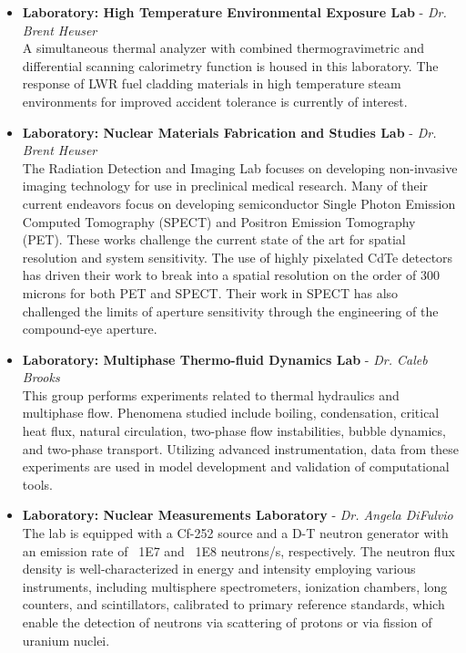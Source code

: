 \begin{itemize}
  \item \textbf{Laboratory: High Temperature Environmental Exposure Lab} - \textit{Dr. Brent Heuser}\\
  A simultaneous thermal analyzer with combined thermogravimetric and differential scanning calorimetry function is housed in this laboratory. The response of LWR fuel cladding materials in high temperature steam environments for improved accident tolerance is currently of interest.

  \item \textbf{Laboratory: Nuclear Materials Fabrication and Studies Lab} - \textit{Dr. Brent Heuser}\\
  The Radiation Detection and Imaging Lab focuses on developing non-invasive imaging technology for use in preclinical medical research. Many of their current endeavors focus on developing semiconductor Single Photon Emission Computed Tomography (SPECT) and Positron Emission Tomography (PET). These works challenge the current state of the art for spatial resolution and system sensitivity. The use of highly pixelated CdTe detectors has driven their work to break into a spatial resolution on the order of 300 microns for both PET and SPECT. Their work in SPECT has also challenged the limits of aperture sensitivity through the engineering of the compound-eye aperture.

  \item \textbf{Laboratory: Multiphase Thermo-fluid Dynamics Lab} - \textit{Dr. Caleb Brooks}\\
  This group performs experiments related to thermal hydraulics and multiphase flow. Phenomena studied include boiling, condensation, critical heat flux, natural circulation, two-phase flow instabilities, bubble dynamics, and two-phase transport. Utilizing advanced instrumentation, data from these experiments are used in model development and validation of computational tools.
  \item \textbf{Laboratory: Nuclear Measurements Laboratory} - \textit{Dr.  Angela DiFulvio}\\ The lab is equipped with a Cf-252 source and a D-T neutron generator with an emission rate of ~1E7 and ~1E8 neutrons/s, respectively. The neutron flux density is well-characterized in energy and intensity employing various instruments, including multisphere spectrometers, ionization chambers, long counters, and scintillators, calibrated to primary reference standards, which enable the detection of neutrons via scattering of protons or via fission of uranium nuclei.
\end{itemize}
